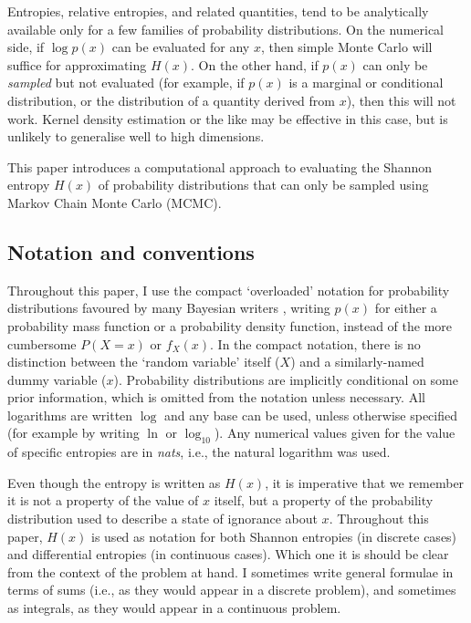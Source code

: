 \documentclass[entropy,article,accept,oneauthor,pdftex,10pt,a4paper]{mdpi}
\begin{document}
Entropies, relative entropies, and related quantities,
tend to be analytically available only for
a few families of probability distributions. On the numerical side, if
$\log p(x)$ can be evaluated for any $x$, then simple Monte Carlo will suffice
for approximating $H(x)$. On the other hand, if $p(x)$ can only be
{\em sampled} but not evaluated (for example, if $p(x)$ is a marginal or
conditional distribution, or the distribution of a quantity derived from $x$),
then this will not work. Kernel density estimation or the like
\citep[e.g.][]{JMLR:v15:szabo14a}
may be effective in this case, but is unlikely to generalise well to high
dimensions.

This paper introduces a computational approach to evaluating the Shannon
entropy $H(x)$ of probability distributions that can only be sampled
using Markov Chain Monte Carlo (MCMC).

\subsection{Notation and conventions}

Throughout this paper, I use the compact
`overloaded' notation for probability distributions favoured by many
Bayesian writers \citep{jaynes2003probability, mackay2003information},
writing $p(x)$ for either a probability mass function
or a probability density function, instead
of the more cumbersome $P(X=x)$ or $f_X(x)$.
In the compact notation, there is no distinction between the
`random variable' itself ($X$) and a similarly-named dummy variable ($x$).
Probability distributions are implicitly conditional on some prior
information, which is omitted from the notation unless necessary.
All logarithms are written $\log$ and any base can be used, unless otherwise
specified (for example by writing $\ln$ or $\log_{10}$). Any numerical
values given for the value of specific entropies are in {\em nats}, i.e.,
the natural logarithm was used.

Even though the entropy is written as $H(x)$, it is imperative that we
remember it is not a property of the value of $x$ itself, but a property
of the probability distribution used to describe a state of ignorance about $x$.
Throughout this paper, $H(x)$ is used as notation for both Shannon entropies
(in discrete cases) and differential entropies (in continuous cases). Which
one it is should be clear from the context of the problem at hand.
I sometimes write general formulae in terms of sums (i.e., as they would
appear in a discrete problem), and sometimes as integrals, as they would
appear in a continuous problem.
\end{document}
